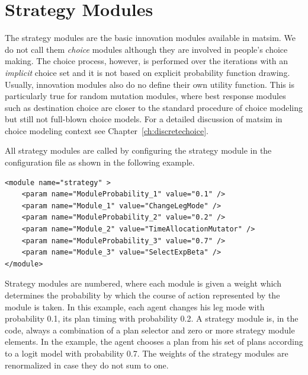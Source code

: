 
\section{Strategy Modules}
\label{sec:strategymodules}
The strategy modules are the basic innovation modules available in \gls{matsim}. We do not call them \emph{choice} modules although they are involved in people's choice making. The choice process, however, is performed over the iterations with an \emph{implicit} choice set and it is not based on explicit probability function drawing. Usually, innovation modules also do no define their own utility function. This is particularly true for random mutation modules, where best response modules such as destination choice are closer to the standard procedure of choice modeling but still not full-blown choice models. For a detailed discussion of \gls{matsim} in choice modeling context see Chapter~\ref{ch:discretechoice}.

All strategy modules are called by configuring the strategy module in the configuration file as shown in the following example.
%
\begin{lstlisting}
<module name="strategy" >
    <param name="ModuleProbability_1" value="0.1" />
    <param name="Module_1" value="ChangeLegMode" />
    <param name="ModuleProbability_2" value="0.2" />
    <param name="Module_2" value="TimeAllocationMutator" />
    <param name="ModuleProbability_3" value="0.7" />
    <param name="Module_3" value="SelectExpBeta" />
</module>
\end{lstlisting}
%
%
Strategy modules are numbered, where each module is given a weight which determines the probability by which the course of action represented by the module is taken. In this example, each agent changes his leg mode with probability 0.1, its plan timing with probability 0.2. A strategy module is, in the code, always a combination of a plan selector and zero or more strategy module elements. In the example, the agent chooses a plan from his set of plans according to a logit model with probability 0.7. The weights of the strategy modules are renormalized in case they do not sum to one.

